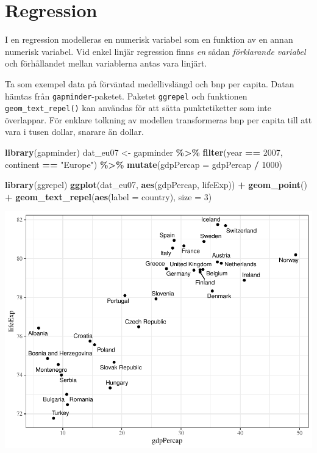 \documentclass[
]{book}
\newenvironment{Shaded}{\begin{snugshade}}{\end{snugshade}}
\newcommand{\AttributeTok}[1]{\textcolor[rgb]{0.13,0.29,0.53}{#1}}
\newcommand{\DecValTok}[1]{\textcolor[rgb]{0.00,0.00,0.81}{#1}}
\newcommand{\FunctionTok}[1]{\textcolor[rgb]{0.13,0.29,0.53}{\textbf{#1}}}
\newcommand{\NormalTok}[1]{#1}
\newcommand{\OtherTok}[1]{\textcolor[rgb]{0.56,0.35,0.01}{#1}}
\newcommand{\SpecialCharTok}[1]{\textcolor[rgb]{0.81,0.36,0.00}{\textbf{#1}}}
\newcommand{\StringTok}[1]{\textcolor[rgb]{0.31,0.60,0.02}{#1}}
\theoremstyle{definition}
\theoremstyle{definition}
\theoremstyle{definition}
\theoremstyle{definition}
\theoremstyle{remark}
\begin{document}
\section{Regression}\label{regression}

I en regression modelleras en numerisk variabel som en funktion av en annan numerisk variabel. Vid enkel linjär regression finns \emph{en} sådan \emph{förklarande variabel} och förhållandet mellan variablerna antas vara linjärt.

Ta som exempel data på förväntad medellivslängd och bnp per capita. Datan hämtas från \texttt{gapminder}-paketet. Paketet \texttt{ggrepel} och funktionen \texttt{geom\_text\_repel()} kan användas för att sätta punktetiketter som inte överlappar. För enklare tolkning av modellen transformeras bnp per capita till att vara i tusen dollar, snarare än dollar.

\begin{Shaded}
\begin{Highlighting}[]
\FunctionTok{library}\NormalTok{(gapminder)}
\NormalTok{dat\_eu07 }\OtherTok{\textless{}{-}}\NormalTok{ gapminder }\SpecialCharTok{\%\textgreater{}\%} 
  \FunctionTok{filter}\NormalTok{(year }\SpecialCharTok{==} \DecValTok{2007}\NormalTok{, continent }\SpecialCharTok{==} \StringTok{"Europe"}\NormalTok{) }\SpecialCharTok{\%\textgreater{}\%} 
  \FunctionTok{mutate}\NormalTok{(}\AttributeTok{gdpPercap =}\NormalTok{ gdpPercap }\SpecialCharTok{/} \DecValTok{1000}\NormalTok{)}

\FunctionTok{library}\NormalTok{(ggrepel)}
\FunctionTok{ggplot}\NormalTok{(dat\_eu07, }\FunctionTok{aes}\NormalTok{(gdpPercap, lifeExp)) }\SpecialCharTok{+}
  \FunctionTok{geom\_point}\NormalTok{() }\SpecialCharTok{+}
  \FunctionTok{geom\_text\_repel}\NormalTok{(}\FunctionTok{aes}\NormalTok{(}\AttributeTok{label =}\NormalTok{ country), }\AttributeTok{size =} \DecValTok{3}\NormalTok{)}
\end{Highlighting}
\end{Shaded}

\begin{center}\includegraphics{R-anvisningar_files/figure-latex/unnamed-chunk-265-1} \end{center}
\end{document}

